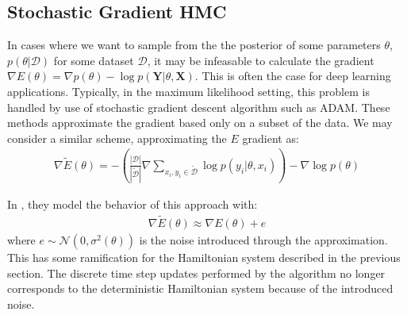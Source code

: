 

    
\subsection{Stochastic Gradient HMC}

In cases where we want to sample from the the posterior of some parameters $\theta$,  $p(\theta | \mathcal{D})$ for some dataset $\mathcal{D}$, it may be infeasable to calculate the gradient $\nabla E(\theta) = \nabla p(\theta) - \log{p(\bm{Y} | \theta, \bm{X})}$. 
This is often the case for deep learning applications.
Typically, in the maximum likelihood setting, this problem is handled by use of stochastic gradient descent algorithm such as ADAM. 
These methods approximate the gradient based only on a subset of the data. 
We may consider a similar scheme, approximating the $E$ gradient as:
\begin{align*}
    \nabla\tilde{E}(\theta) = -\left(\frac{|\mathcal{D}|}{|\tilde{\mathcal{D}}|}  \nabla \sum_{x_i, y_i\in \tilde{\mathcal{D}}} \log{p(y_i |\theta, x_i)}\right)  -\nabla \log{p(\theta)}
\end{align*}

In \cite{chen_stochastic_2014}, they model the behavior of this approach with:
\begin{align} \label{eq:sghmc-model}
    \nabla\tilde{E}(\theta) \approx \nabla{E}(\theta) + e
\end{align}
where $e \sim \mathcal{N}(0, \sigma^2(\theta))$ is the noise introduced through the approximation. This has some ramification for the Hamiltonian system described in the previous section. 
The discrete time step updates performed by the algorithm no longer corresponds to the deterministic Hamiltonian system because of the introduced noise. 


